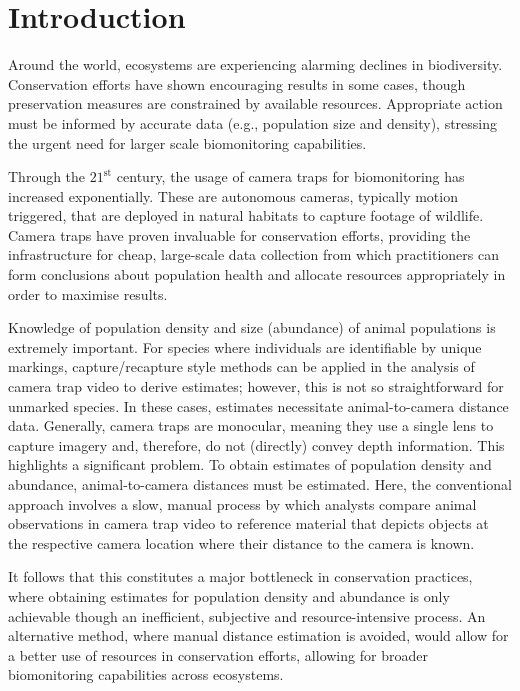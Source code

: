 \section{Introduction}

Around the world, ecosystems are experiencing alarming declines in biodiversity.
Conservation efforts have shown encouraging results in some cases,\cite{bd_1,bd_2,bd_3}
though preservation measures
are constrained by available resources.\cite{conservation_funding}
Appropriate action must be informed by accurate data (e.g., population size and density), stressing
the urgent need for larger scale biomonitoring capabilities.\cite{conservation_data}

Through the $\mathrm{21}^{\mathrm{st}}$ century, the usage of camera traps for biomonitoring has
increased exponentially.\cite{ct_usage}
These are autonomous cameras, typically motion triggered, that are deployed in natural habitats to
capture footage of wildlife.
Camera traps have proven invaluable for conservation efforts,\cite{ct_success} providing the
infrastructure for cheap, large-scale data collection from which practitioners can form conclusions about population
health and allocate resources appropriately in order to maximise results.\cite{ct_usage}

Knowledge of population density and size (abundance) of animal populations is extremely important.
For species where individuals are identifiable by unique markings, capture/recapture style methods
can be applied in the analysis of camera trap video to derive estimates;\cite{capture_recapture}
however, this is not so straightforward for unmarked species.
In these cases, estimates necessitate animal-to-camera distance data.\cite{ctds}
Generally, camera traps are monocular, meaning they use a single lens to capture imagery and, therefore,
do not (directly) convey depth information.
This highlights a significant problem.
To obtain estimates of population density and abundance, animal-to-camera distances must be estimated.
Here, the conventional approach involves a slow, manual process by which analysts compare animal
observations in camera trap video to reference material that depicts objects at the respective camera
location where their distance to the camera is known.\cite{HAUCKE2022101536}

It follows that this constitutes a major bottleneck in conservation practices, where obtaining
estimates for population density and abundance is only achievable though an inefficient, subjective
and resource-intensive process.
An alternative method, where manual distance estimation is avoided, would allow for a better use
of resources in conservation efforts, allowing for broader biomonitoring capabilities across
ecosystems.

